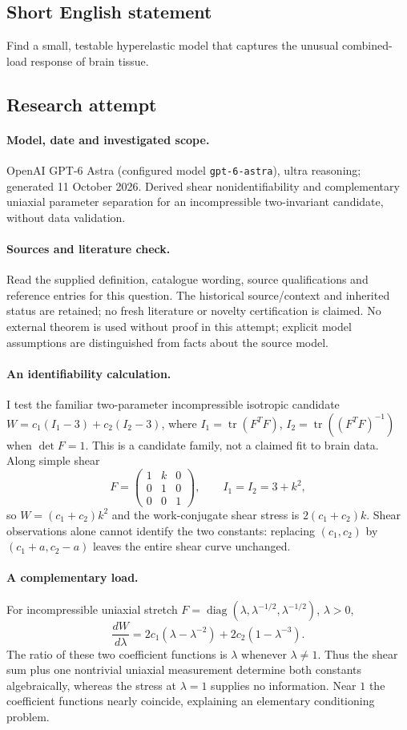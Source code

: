 \documentclass[11pt]{article}
\begin{document}
\subsection{Short English statement}
Find a small, testable hyperelastic model that captures the unusual combined-load response of brain tissue.
\subsection{Research attempt}
\paragraph{Model, date and investigated scope.}
OpenAI GPT-6 Astra (configured model \texttt{gpt-6-astra}), ultra reasoning; generated 11 October 2026. Derived shear nonidentifiability and complementary uniaxial parameter separation for an incompressible two-invariant candidate, without data validation.

\paragraph{Sources and literature check.}
Read the supplied definition, catalogue wording, source qualifications and reference entries for this question. The historical source/context and inherited status are retained; no fresh literature or novelty certification is claimed. No external theorem is used without proof in this attempt; explicit model assumptions are distinguished from facts about the source model.

\paragraph{An identifiability calculation.} I test the familiar two-parameter incompressible isotropic candidate \(W=c_1(I_1-3)+c_2(I_2-3)\), where \(I_1=\operatorname{tr}(F^TF)\), \(I_2=\operatorname{tr}((F^TF)^{-1})\) when \(\det F=1\). This is a candidate family, not a claimed fit to brain data. Along simple shear
\[
 F=\begin{pmatrix}1&k&0\\0&1&0\\0&0&1\end{pmatrix},
 \qquad I_1=I_2=3+k^2,
\]
so \(W=(c_1+c_2)k^2\) and the work-conjugate shear stress is \(2(c_1+c_2)k\). Shear observations alone cannot identify the two constants: replacing \((c_1,c_2)\) by \((c_1+a,c_2-a)\) leaves the entire shear curve unchanged.
\paragraph{A complementary load.} For incompressible uniaxial stretch \(F=\operatorname{diag}(\lambda,\lambda^{-1/2},\lambda^{-1/2})\), \(\lambda>0\),
\[
 \frac{dW}{d\lambda}=2c_1(\lambda-\lambda^{-2})+2c_2(1-\lambda^{-3}).
\]
The ratio of these two coefficient functions is \(\lambda\) whenever \(\lambda\ne1\). Thus the shear sum plus one nontrivial uniaxial measurement determine both constants algebraically, whereas the stress at \(\lambda=1\) supplies no information. Near \(1\) the coefficient functions nearly coincide, explaining an elementary conditioning problem.
\end{document}
